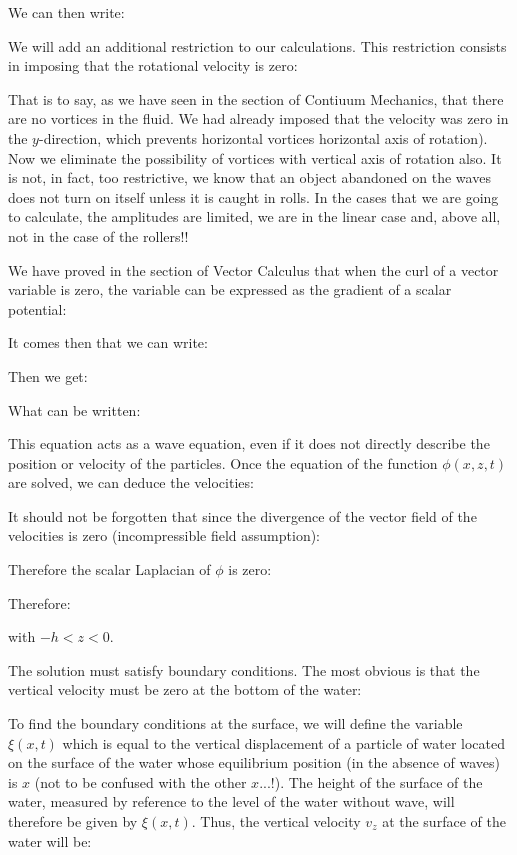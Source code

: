 	We can then write:
	
	We will add an additional restriction to our calculations. This restriction consists in imposing that the rotational velocity is zero:
	
	That is to say, as we have seen in the section of Contiuum Mechanics, that there are no vortices in the fluid. We had already imposed that the velocity was zero in the $y$-direction, which prevents horizontal vortices horizontal axis of rotation). Now we eliminate the possibility of vortices with vertical axis of rotation also. It is not, in fact, too restrictive, we know that an object abandoned on the waves does not turn on itself unless it is caught in rolls. In the cases that we are going to calculate, the amplitudes are limited, we are in the linear case and, above all, not in the case of the rollers!!

	We have proved in the section of Vector Calculus that when the curl of a vector variable is zero, the variable can be expressed as the gradient of a scalar potential:
	
	It comes then that we can write:
	
	Then we get:
	
	What can be written:
	
	This equation acts as a wave equation, even if it does not directly describe the position or velocity of the particles. Once the equation of the function $\phi(x,z,t)$ are solved, we can deduce the velocities:
	
	It should not be forgotten that since the divergence of the vector field of the velocities is zero (incompressible field assumption):
	
	Therefore the scalar Laplacian of $\phi$ is zero:
	
	Therefore:
	
	with $-h<z<0$.
	
	The solution must satisfy boundary conditions. The most obvious is that the vertical velocity must be zero at the bottom of the water:
	
	To find the boundary conditions at the surface, we will define the variable $\xi(x,t)$ which is equal to the vertical displacement of a particle of water located on the surface of the water whose equilibrium position (in the absence of waves) is $x$ (not to be confused with the other $x$...!). The height of the surface of the water, measured by reference to the level of the water without wave, will therefore be given by $\xi(x,t)$. Thus, the vertical velocity $v_z$ at the surface of the water will be:
	
